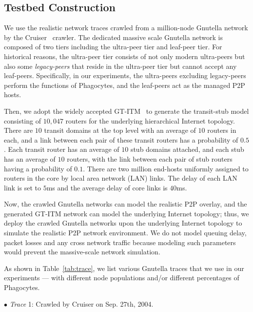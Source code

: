 \documentclass[times,10pt,twocolumn]{article}
\begin{document}
\subsection{Testbed Construction}






We use the realistic network traces crawled from a million-node
Gnutella network by the Cruiser~\cite{Characterizing:Stutzbach2005}
crawler. The dedicated massive scale Gnutella network is composed of
two tiers including the ultra-peer tier and leaf-peer tier. For
historical reasons, the ultra-peer tier consists of not only modern
ultra-peers but also some \emph{legacy-peers} that reside in the
ultra-peer tier but cannot accept any leaf-peers. Specifically, in
our experiments, the ultra-peers excluding legacy-peers perform the
functions of Phagocytes, and the leaf-peers act as the managed P2P
hosts.


Then, we adopt the widely accepted GT-ITM~\cite{zegura96how} to
generate the transit-stub model consisting of $10,047$ routers for
the underlying hierarchical Internet topology. There are $10$
transit domains at the top level with an average of $10$ routers in
each, and a link between each pair of these transit routers has a
probability of $0.5$. Each transit router has an average of $10$
stub domains attached, and each stub has an average of $10$ routers,
with the link between each pair of stub routers having a probability
of $0.1$. There are two million end-hosts uniformly assigned to
routers in the core by local area network (LAN) links. The delay of
each LAN link is set to $5$ms and the average delay of core links is
$40$ms.


Now, the crawled Gnutella networks can model the realistic P2P
overlay, and the generated GT-ITM network can model the underlying
Internet topology; thus, we deploy the crawled Gnutella networks
upon the underlying Internet topology to simulate the realistic P2P
network environment. We do not model queuing delay, packet losses
and any cross network traffic because modeling such parameters would
prevent the massive-scale network simulation.








As shown in Table~\ref{tab:trace}, we list various Gnutella traces
that we use in our experiments --- with different node populations
and/or different percentages of Phagocytes.


$\bullet$ \emph{Trace} 1: Crawled by Cruiser on Sep. 27th, 2004.
\end{document}
